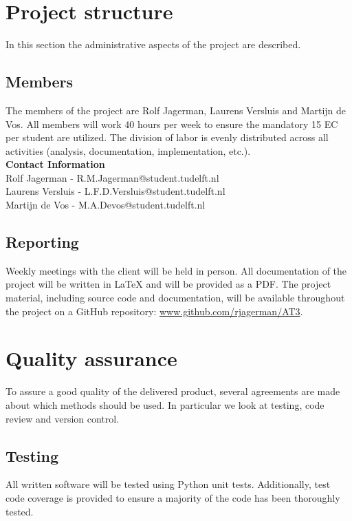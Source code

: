 \section{Project structure}

In this section the administrative aspects of the project are described.

\subsection{Members}
The members of the project are Rolf Jagerman, Laurens Versluis and Martijn de Vos. All members will work 40 hours per week to ensure the mandatory 15 EC per student are utilized. The division of labor is evenly distributed across all activities (analysis, documentation, implementation, etc.).\\

\noindent\textbf{Contact Information}\\
Rolf Jagerman - R.M.Jagerman@student.tudelft.nl\\
Laurens Versluis - L.F.D.Versluis@student.tudelft.nl\\
Martijn de Vos - M.A.Devos@student.tudelft.nl

\subsection{Reporting}
Weekly meetings with the client will be held in person. All documentation of the project will be written in {\LaTeX} and will be provided as a PDF. The project material, including source code and documentation, will be available throughout the project on a GitHub repository: \href{http://www.github.com/rjagerman/AT3/}{www.github.com/rjagerman/AT3}.

\section{Quality assurance}

To assure a good quality of the delivered product, several agreements are made about which methods should be used. In particular we look at testing, code review and version control.

\subsection{Testing}
All written software will be tested using Python unit tests. Additionally, test code coverage is provided to ensure a majority of the code has been thoroughly tested.


